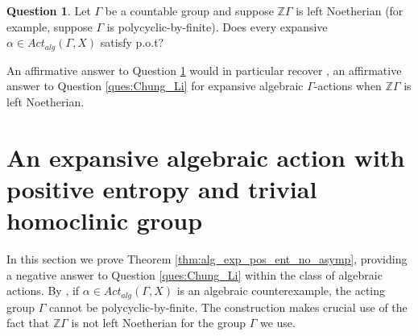 \documentclass[oneside,english]{amsart}
\newtheorem{cor}[thm]{Corollary}
\theoremstyle{definition}
\newtheorem{question}[thm]{Question}
\newcommand{\ZZ}{\mathbb{Z}}
\newcommand{\act}[2]{{#1} \curvearrowright {#2}}
\newcommand{\Alg}[2]{\mathit{Act}_{\mathit{alg}}({#1},{#2})}
\begin{document}

\begin{question}\label{ques:noetherian_pot}
Let $\Gamma$ be a  countable group and suppose $\ZZ \Gamma$ is left Noetherian (for example, suppose $\Gamma$ is polycyclic-by-finite). Does every expansive $\alpha \in \Alg{\Gamma}{X}$ satisfy p.o.t?
\end{question}

An affirmative answer to Question \ref{ques:noetherian_pot} would in particular recover \cite[Corollary 9.12]{MR3314515}, an affirmative answer to Question \ref{ques:Chung_Li} for expansive algebraic $\Gamma$-actions when $\ZZ \Gamma$ is left Noetherian.

\section{An expansive algebraic action with positive entropy and trivial homoclinic group}\label{sec:algebraic_exp_no_asymp}
In this section we prove Theorem \ref{thm:alg_exp_pos_ent_no_asymp}, providing a negative answer to Question \ref{ques:Chung_Li} within the class of algebraic actions.
By \cite{MR3314515},  if  $\alpha \in \Alg{\Gamma}{X}$ is an algebraic counterexample,  the acting group $\Gamma$ cannot be polycyclic-by-finite.
The construction makes crucial use of the fact that $\mathbb{Z}\Gamma$ is not left Noetherian for the group $\Gamma$ we use.
\end{document}
